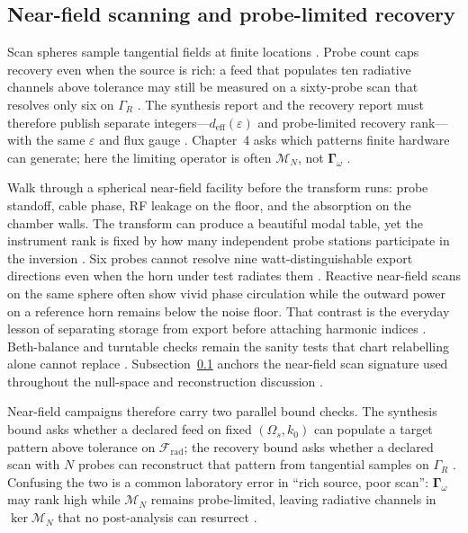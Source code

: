 \subsection{Near-field scanning and probe-limited recovery}
\label{sec:ch47.signature-nfscan}
Scan spheres sample tangential fields at finite locations \cite{harrington2001}. Probe count caps recovery even when the source is rich: a feed that populates ten radiative channels above tolerance may still be measured on a sixty-probe scan that resolves only six on $\Gamma_R$ \cite{devaney2004}. The synthesis report and the recovery report must therefore publish separate integers---$d_{\mathrm{eff}}(\varepsilon)$ and probe-limited recovery rank---with the same $\varepsilon$ and flux gauge \cite{stratton1941}. Chapter~4 asks which patterns finite hardware can generate; here the limiting operator is often $\mathcal{M}_N$, not $\boldsymbol{\Gamma}_\omega$ \cite{harrington2001}.
\begin{physicalvignette}
Walk through a spherical near-field facility before the transform runs: probe standoff, cable phase, RF leakage on the floor, and the absorption on the chamber walls. The transform can produce a beautiful modal table, yet the instrument rank is fixed by how many independent probe stations participate in the inversion \cite{hansen1988}. Six probes cannot resolve nine watt-distinguishable export directions even when the horn under test radiates them \cite{stratton1941}.
Reactive near-field scans on the same sphere often show vivid phase circulation while the outward power on a reference horn remains below the noise floor. That contrast is the everyday lesson of separating storage from export before attaching harmonic indices \cite{harrington2001}. Beth-balance and turntable checks remain the sanity tests that chart relabelling alone cannot replace \cite{beth1936}.
Subsection~\ref{sec:ch47.signature-nfscan} anchors the near-field scan signature used throughout the null-space and reconstruction discussion \cite{stratton1941}.
\end{physicalvignette}
Near-field campaigns therefore carry two parallel bound checks. The synthesis bound asks whether a declared feed on fixed \((\Omega_s,k_0)\) can populate a target pattern above tolerance on $\mathcal{F}_{\mathrm{rad}}$; the recovery bound asks whether a declared scan with $N$ probes can reconstruct that pattern from tangential samples on $\Gamma_R$ \cite{harrington2001}. Confusing the two is a common laboratory error in ``rich source, poor scan'': $\boldsymbol{\Gamma}_\omega$ may rank high while $\mathcal{M}_N$ remains probe-limited, leaving radiative channels in $\ker\mathcal{M}_N$ that no post-analysis can resurrect \cite{devaney2004}.
